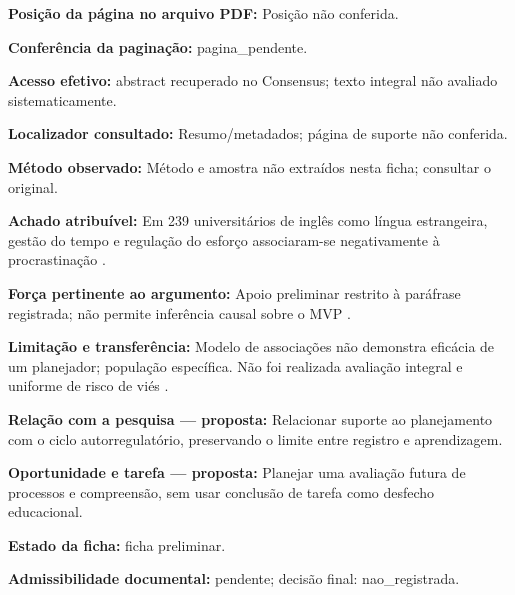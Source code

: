 \noindent\textbf{Posição da página no arquivo PDF:} Posição não conferida.\par\medskip

\noindent\textbf{Conferência da paginação:} pagina\_pendente.\par\medskip

\noindent\textbf{Acesso efetivo:} abstract recuperado no Consensus; texto integral não avaliado sistematicamente.\par\medskip

\noindent\textbf{Localizador consultado:} Resumo/metadados; página de suporte não conferida.\par\medskip

\noindent\textbf{Método observado:} Método e amostra não extraídos nesta ficha; consultar o original.\par\medskip

\noindent\textbf{Achado atribuível:} Em 239 universitários de inglês como língua estrangeira, gestão do tempo e regulação do esforço associaram-se negativamente à procrastinação \citep{education_tao2025}.\par\medskip

\noindent\textbf{Força pertinente ao argumento:} Apoio preliminar restrito à paráfrase registrada; não permite inferência causal sobre o MVP \citep{education_tao2025}.\par\medskip

\noindent\textbf{Limitação e transferência:} Modelo de associações não demonstra eficácia de um planejador; população específica. Não foi realizada avaliação integral e uniforme de risco de viés \citep{education_tao2025}.\par\medskip

\noindent\textbf{Relação com a pesquisa — proposta:} Relacionar suporte ao planejamento com o ciclo autorregulatório, preservando o limite entre registro e aprendizagem.\par\medskip

\noindent\textbf{Oportunidade e tarefa — proposta:} Planejar uma avaliação futura de processos e compreensão, sem usar conclusão de tarefa como desfecho educacional.\par\medskip

\noindent\textbf{Estado da ficha:} ficha preliminar.\par\medskip

\noindent\textbf{Admissibilidade documental:} pendente; decisão final: nao\_registrada.\par\medskip

